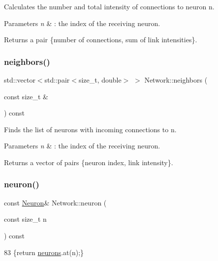 Calculates the number and total intensity of connections to neuron {\ttfamily n}. 
\begin{DoxyParams}{Parameters}
{\em n} & \+: the index of the receiving neuron. \\
\hline
\end{DoxyParams}
\begin{DoxyReturn}{Returns}
a pair \{number of connections, sum of link intensities\}. 
\end{DoxyReturn}
\mbox{\label{classNetwork_a98bbf44b077ba1bec5a62ecffc405503}} 
\subsubsection{\texorpdfstring{neighbors()}{neighbors()}}
{\footnotesize\ttfamily std\+::vector$<$std\+::pair$<$size\+\_\+t, double$>$ $>$ Network\+::neighbors (\begin{DoxyParamCaption}\item[{const size\+\_\+t \&}]{ }\end{DoxyParamCaption}) const}

Finds the list of neurons with incoming connections to {\ttfamily n}. 
\begin{DoxyParams}{Parameters}
{\em n} & \+: the index of the receiving neuron. \\
\hline
\end{DoxyParams}
\begin{DoxyReturn}{Returns}
a vector of pairs \{neuron index, link intensity\}. 
\end{DoxyReturn}
\mbox{\label{classNetwork_a4639c4fd24bc6dc807ae35af6577ed7f}} 
\subsubsection{\texorpdfstring{neuron()}{neuron()}}
{\footnotesize\ttfamily const \hyperlink{classNeuron}{Neuron}\& Network\+::neuron (\begin{DoxyParamCaption}\item[{const size\+\_\+t}]{n }\end{DoxyParamCaption}) const\hspace{0.3cm}{\ttfamily [inline]}}


\begin{DoxyCode}
83 \{\textcolor{keywordflow}{return} \hyperlink{classNetwork_a1b7832bc2c7b8855cdc3b2d6329eff9d}{neurons}.at(n);\}
\end{DoxyCode}
\mbox{\label{classNetwork_a44d9c341bfec26cb37efe3c29fd7a103}} 
